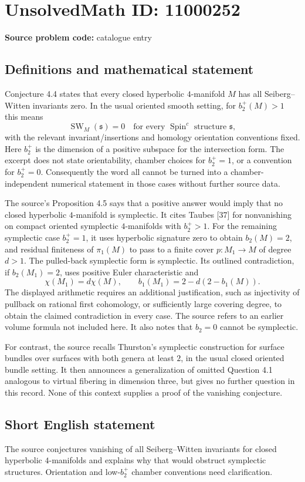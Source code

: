 \documentclass[11pt]{article}
\begin{document}
\section*{UnsolvedMath ID: 11000252}
\textbf{Source problem code:} catalogue entry
\subsection{Definitions and mathematical statement}
Conjecture 4.4 states that every closed hyperbolic $4$-manifold $M$ has all Seiberg--Witten invariants zero. In the usual oriented smooth setting, for $b_2^+(M)>1$ this means
\[
 \operatorname{SW}_M(\mathfrak s)=0
 \quad\text{for every }\operatorname{Spin}^c\text{ structure }\mathfrak s,
\]
with the relevant invariant/insertions and homology orientation conventions fixed. Here $b_2^+$ is the dimension of a positive subspace for the intersection form. The excerpt does not state orientability, chamber choices for $b_2^+=1$, or a convention for $b_2^+=0$. Consequently the word all cannot be turned into a chamber-independent numerical statement in those cases without further source data.

The source's Proposition 4.5 says that a positive answer would imply that no closed hyperbolic $4$-manifold is symplectic. It cites Taubes [37] for nonvanishing on compact oriented symplectic $4$-manifolds with $b_2^+>1$. For the remaining symplectic case $b_2^+=1$, it uses hyperbolic signature zero to obtain $b_2(M)=2$, and residual finiteness of $\pi_1(M)$ to pass to a finite cover $p:M_1\to M$ of degree $d>1$. The pulled-back symplectic form is symplectic. Its outlined contradiction, if $b_2(M_1)=2$, uses positive Euler characteristic and
\[
 \chi(M_1)=d\chi(M),\qquad
 b_1(M_1)=2-d(2-b_1(M)).
\]
The displayed arithmetic requires an additional justification, such as injectivity of pullback on rational first cohomology, or sufficiently large covering degree, to obtain the claimed contradiction in every case. The source refers to an earlier volume formula not included here. It also notes that $b_2=0$ cannot be symplectic.

For contrast, the source recalls Thurston's symplectic construction for surface bundles over surfaces with both genera at least $2$, in the usual closed oriented bundle setting. It then announces a generalization of omitted Question 4.1 analogous to virtual fibering in dimension three, but gives no further question in this record. None of this context supplies a proof of the vanishing conjecture.
\subsection{Short English statement}
The source conjectures vanishing of all Seiberg--Witten invariants for closed hyperbolic $4$-manifolds and explains why that would obstruct symplectic structures. Orientation and low-$b_2^+$ chamber conventions need clarification.
\end{document}
